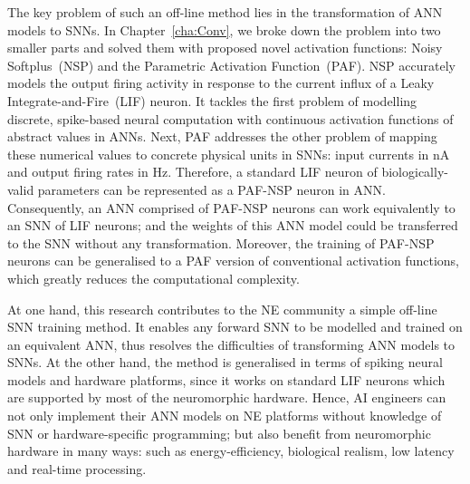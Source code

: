 The key problem of such an off-line method lies in the transformation of ANN models to SNNs.
In Chapter~\ref{cha:Conv}, we broke down the problem into two smaller parts and solved them with proposed novel activation functions: Noisy Softplus~(NSP) and the Parametric Activation Function~(PAF).
NSP accurately models the output firing activity in response to the current influx of a Leaky Integrate-and-Fire~(LIF) neuron.
It tackles the first problem of modelling discrete, spike-based neural computation with continuous activation functions of abstract values in ANNs.
Next, PAF addresses the other problem of mapping these numerical values to concrete physical units in SNNs: input currents in nA and output firing rates in Hz.
Therefore, a standard LIF neuron of biologically-valid parameters can be represented as a PAF-NSP neuron in ANN.
Consequently, an ANN comprised of PAF-NSP neurons can work equivalently to an SNN of LIF neurons; and the weights of this ANN model could be transferred to the SNN without any transformation.
Moreover, the training of PAF-NSP neurons can be generalised to a PAF version of conventional activation functions, which greatly reduces the computational complexity.


At one hand, this research contributes to the NE community a simple off-line SNN training method.
It enables any forward SNN to be modelled and trained on an equivalent ANN, thus resolves the difficulties of transforming ANN models to SNNs.
At the other hand, the method is generalised in terms of spiking neural models and hardware platforms, since it works on standard LIF neurons which are supported by most of the neuromorphic hardware.
Hence, AI engineers can not only implement their ANN models on NE platforms without knowledge of SNN or hardware-specific programming;
but also benefit from neuromorphic hardware in many ways: such as energy-efficiency, biological realism, low latency and real-time processing.


